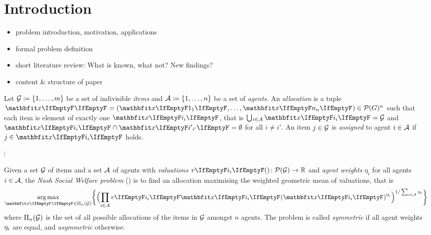 \section{Introduction}
\label{sec:intro}

\begin{itemize}
	\item
	problem introduction, motivation, applications

	\item
	formal problem definition

	\item
	short literature review: What is known, what not? New findings?

	\item
	content \& structure of paper
\end{itemize}

\begin{definition}
	Let \(\mathcal{G} \coloneq \{1, \dots, m\}\) be a set of indivisible \emph{items} and \(\mathcal{A} \coloneq \{1, \dots, n\}\) be a set of \emph{agents}.
	An \emph{allocation} is a tuple \(\alloc = ( \alloc[1], \dots, \alloc[n] ) \in \powerset[G]^n\) such that each item is element of exactly one \(\alloc[i]\), that is \(\mathop{\bigcup\hspace{-1pt}_{i \in \agents}} \alloc[i] = \goods\) and \(\alloc[i] \cap \alloc[i'] = \emptyset\) for all \(i \neq i'\).
	An item \(j \in \mathcal{G}\) is \emph{assigned} to agent \(i \in \mathcal{A}\) if \(j \in \alloc[i]\) holds.
\end{definition}

\(\vdots\)

\begin{definition}
	Given a set \(\mathcal{G}\) of items and a set \(\mathcal{A}\) of agents with \emph{valuations} \(\valuations[i] \colon \powerset[\goods] \to \real\) and \emph{agent weights} \(\eta_i\) for all agents \(i \in \mathcal{A}\), the \emph{Nash Social Welfare problem} (\NSW) is to find an allocation maximising the weighted geometric mean of valuations, that is
	\begin{equation*}
		\argmax_{\alloc \in \allallocs{n}{\goods}} \braces[\bigg]{ \paren[\Big]{ \prod_{i \in \agents} \valuations[i][\alloc[i]]^{\weight{i}} }^{1 / \sum_{i \in \agents} \weight{i}} }
	\end{equation*}
	where \(\Pi_{n}(\mathcal{G})\) is the set of all possible allocations of the items in \(\mathcal{G}\) amongst \(n\) agents.
	The problem is called \emph{symmetric} if all agent weights \(\eta_{i}\) are equal, and \emph{asymmetric} otherwise.
\end{definition}

